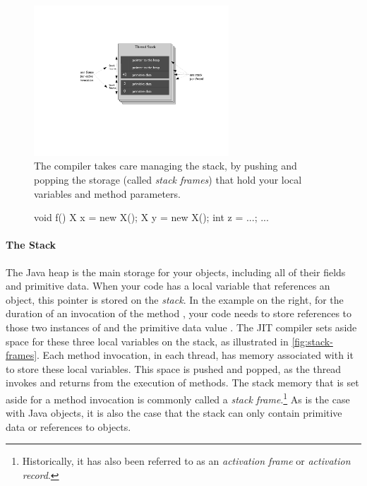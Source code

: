 
\begin{figure}
\centering
\includegraphics[width=0.65\textwidth]{part2/Figures/lifetime/heaps_and_stacks_stack_frames}
\caption{The compiler takes care managing the stack, by pushing and popping
the storage (called \emph{stack frames}) that hold your local variables and
method parameters.}
\label{fig:stack-frames}
\end{figure}

\begin{figure}
\centering
\vspace{-3mm}
\begin{framedlisting}
void f() {
   X x = new X();
   X y = new X();
   int z = ...;
   ...
}
\end{framedlisting}
\end{figure}
\paragraph{The Stack}
The Java heap is the main storage for your objects, including all of their
fields and primitive data. When your code has a local variable that references
an object, this pointer is stored on the \emph{stack}. In the example on the
right, for the duration of an invocation of the method , your code needs
to store references to those two instances of  and the primitive data
value . The JIT compiler sets aside space for these three local
variables on the stack, as illustrated in \autoref{fig:stack-frames}.  Each
method invocation, in each thread, has memory associated with it to store these
local variables. This space is pushed and popped, as the thread invokes and
returns from the execution of methods. The stack memory that is set aside for a
method invocation is commonly called a \emph{stack frame}.\footnote{Historically, it has also been referred to as an
\emph{activation frame} or \emph{activation record}.} As is the case with Java objects, it is also
the case that the stack can only contain primitive data or references to
objects.

